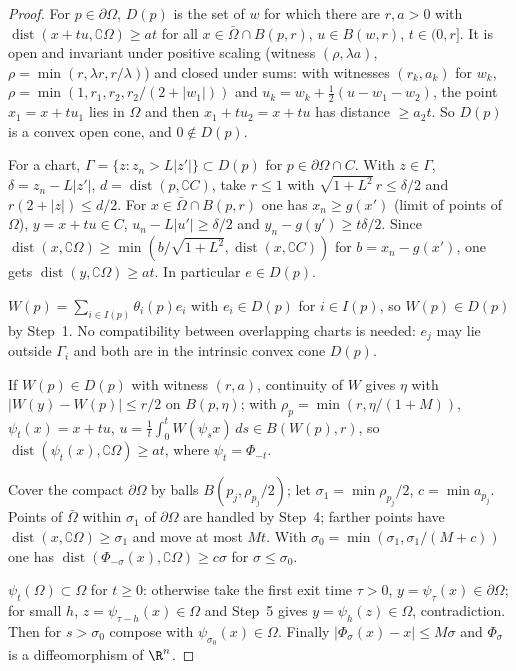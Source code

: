 \begin{proof}
For $p\in\partial\Omega$, $D(p)$ is the set of $w$ for which there are $r,a>0$ with $\operatorname{dist}(x+tu,\complement\Omega)\ge at$ for all $x\in\bar\Omega\cap B(p,r)$, $u\in B(w,r)$, $t\in(0,r]$. It is open and invariant under positive scaling (witness $(\rho,\lambda a)$, $\rho=\min(r,\lambda r,r/\lambda)$) and closed under sums: with witnesses $(r_k,a_k)$ for $w_k$, $\rho=\min(1,r_1,r_2,r_2/(2+|w_1|))$ and $u_k=w_k+\frac12(u-w_1-w_2)$, the point $x_1=x+tu_1$ lies in $\Omega$ and then $x_1+tu_2=x+tu$ has distance $\ge a_2t$. So $D(p)$ is a convex open cone, and $0\notin D(p)$.

For a chart, $\Gamma=\{z:z_n>L|z'|\}\subset D(p)$ for $p\in\partial\Omega\cap C$. With $z\in\Gamma$, $\delta=z_n-L|z'|$, $d=\operatorname{dist}(p,\complement C)$, take $r\le1$ with $\sqrt{1+L^2}\,r\le\delta/2$ and $r(2+|z|)\le d/2$. For $x\in\bar\Omega\cap B(p,r)$ one has $x_n\ge g(x')$ (limit of points of $\Omega$), $y=x+tu\in C$, $u_n-L|u'|\ge\delta/2$ and $y_n-g(y')\ge t\delta/2$. Since $\operatorname{dist}(x,\complement\Omega)\ge\min(b/\sqrt{1+L^2},\operatorname{dist}(x,\complement C))$ for $b=x_n-g(x')$, one gets $\operatorname{dist}(y,\complement\Omega)\ge at$. In particular $e\in D(p)$.

$W(p)=\sum_{i\in I(p)}\theta_i(p)e_i$ with $e_i\in D(p)$ for $i\in I(p)$, so $W(p)\in D(p)$ by Step~1. No compatibility between overlapping charts is needed: $e_j$ may lie outside $\Gamma_i$ and both are in the intrinsic convex cone $D(p)$.

If $W(p)\in D(p)$ with witness $(r,a)$, continuity of $W$ gives $\eta$ with $|W(y)-W(p)|\le r/2$ on $B(p,\eta)$; with $\rho_p=\min(r,\eta/(1+M))$, $\psi_t(x)=x+tu$, $u=\frac1t\int_0^tW(\psi_sx)\,ds\in B(W(p),r)$, so $\operatorname{dist}(\psi_t(x),\complement\Omega)\ge at$, where $\psi_t=\Phi_{-t}$.

Cover the compact $\partial\Omega$ by balls $B(p_j,\rho_{p_j}/2)$; let $\sigma_1=\min\rho_{p_j}/2$, $c=\min a_{p_j}$. Points of $\bar\Omega$ within $\sigma_1$ of $\partial\Omega$ are handled by Step~4; farther points have $\operatorname{dist}(x,\complement\Omega)\ge\sigma_1$ and move at most $Mt$. With $\sigma_0=\min(\sigma_1,\sigma_1/(M+c))$ one has $\operatorname{dist}(\Phi_{-\sigma}(x),\complement\Omega)\ge c\sigma$ for $\sigma\le\sigma_0$.

$\psi_t(\Omega)\subset\Omega$ for $t\ge0$: otherwise take the first exit time $\tau>0$, $y=\psi_\tau(x)\in\partial\Omega$; for small $h$, $z=\psi_{\tau-h}(x)\in\Omega$ and Step~5 gives $y=\psi_h(z)\in\Omega$, contradiction. Then for $s>\sigma_0$ compose with $\psi_{\sigma_0}(x)\in\Omega$. Finally $|\Phi_\sigma(x)-x|\le M\sigma$ and $\Phi_\sigma$ is a diffeomorphism of $\R^n$.

\end{proof}

